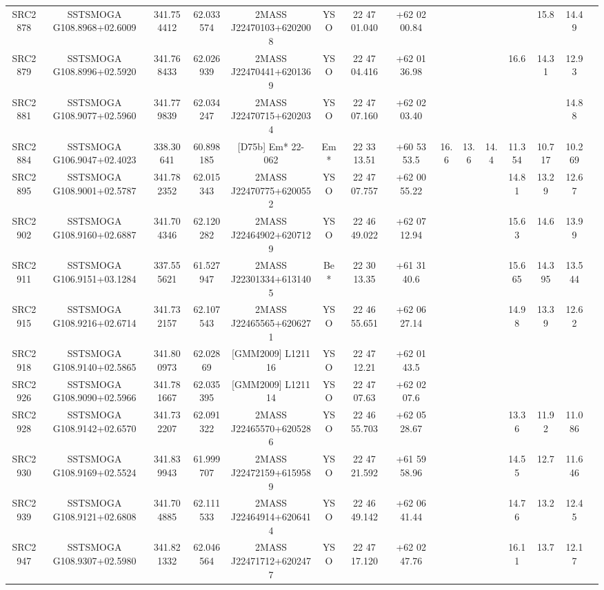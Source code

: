 \begin{table}
\begin{tabular}{ccccccccccccccc}
SRC2878 & SSTSMOGA G108.8968+02.6009 & 341.754412 & 62.033574 & 2MASS J22470103+6202008 & YSO & 22 47 01.040 & +62 02 00.84 &  &  &  &  & 15.8 & 14.49 &  \\
SRC2879 & SSTSMOGA G108.8996+02.5920 & 341.768433 & 62.026939 & 2MASS J22470441+6201369 & YSO & 22 47 04.416 & +62 01 36.98 &  &  &  & 16.6 & 14.31 & 12.93 &  \\
SRC2881 & SSTSMOGA G108.9077+02.5960 & 341.779839 & 62.034247 & 2MASS J22470715+6202034 & YSO & 22 47 07.160 & +62 02 03.40 &  &  &  &  &  & 14.88 &  \\
SRC2884 & SSTSMOGA G106.9047+02.4023 & 338.30641 & 60.898185 & [D75b] Em* 22-062 & Em* & 22 33 13.51 & +60 53 53.5 & 16.6 & 13.6 & 14.4 & 11.354 & 10.717 & 10.269 &  \\
SRC2895 & SSTSMOGA G108.9001+02.5787 & 341.782352 & 62.015343 & 2MASS J22470775+6200552 & YSO & 22 47 07.757 & +62 00 55.22 &  &  &  & 14.81 & 13.29 & 12.67 &  \\
SRC2902 & SSTSMOGA G108.9160+02.6887 & 341.704346 & 62.120282 & 2MASS J22464902+6207129 & YSO & 22 46 49.022 & +62 07 12.94 &  &  &  & 15.63 & 14.6 & 13.99 &  \\
SRC2911 & SSTSMOGA G106.9151+03.1284 & 337.555621 & 61.527947 & 2MASS J22301334+6131405 & Be* & 22 30 13.35 & +61 31 40.6 &  &  &  & 15.665 & 14.395 & 13.544 &  \\
SRC2915 & SSTSMOGA G108.9216+02.6714 & 341.732157 & 62.107543 & 2MASS J22465565+6206271 & YSO & 22 46 55.651 & +62 06 27.14 &  &  &  & 14.98 & 13.39 & 12.62 &  \\
SRC2918 & SSTSMOGA G108.9140+02.5865 & 341.800973 & 62.02869 & [GMM2009] L1211 16 & YSO & 22 47 12.21 & +62 01 43.5 &  &  &  &  &  &  &  \\
SRC2926 & SSTSMOGA G108.9090+02.5966 & 341.781667 & 62.035395 & [GMM2009] L1211 14 & YSO & 22 47 07.63 & +62 02 07.6 &  &  &  &  &  &  &  \\
SRC2928 & SSTSMOGA G108.9142+02.6570 & 341.732207 & 62.091322 & 2MASS J22465570+6205286 & YSO & 22 46 55.703 & +62 05 28.67 &  &  &  & 13.36 & 11.92 & 11.086 &  \\
SRC2930 & SSTSMOGA G108.9169+02.5524 & 341.839943 & 61.999707 & 2MASS J22472159+6159589 & YSO & 22 47 21.592 & +61 59 58.96 &  &  &  & 14.55 & 12.7 & 11.646 &  \\
SRC2939 & SSTSMOGA G108.9121+02.6808 & 341.704885 & 62.111533 & 2MASS J22464914+6206414 & YSO & 22 46 49.142 & +62 06 41.44 &  &  &  & 14.76 & 13.2 & 12.45 &  \\
SRC2947 & SSTSMOGA G108.9307+02.5980 & 341.821332 & 62.046564 & 2MASS J22471712+6202477 & YSO & 22 47 17.120 & +62 02 47.76 &  &  &  & 16.11 & 13.7 & 12.17 &  \\

\end{tabular}
\end{table}
